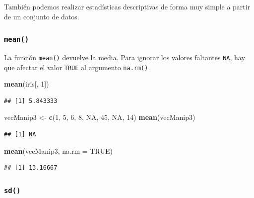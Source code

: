 \documentclass[
]{book}
\newenvironment{Shaded}{\begin{snugshade}}{\end{snugshade}}
\newcommand{\DataTypeTok}[1]{\textcolor[rgb]{0.13,0.29,0.53}{#1}}
\newcommand{\DecValTok}[1]{\textcolor[rgb]{0.00,0.00,0.81}{#1}}
\newcommand{\KeywordTok}[1]{\textcolor[rgb]{0.13,0.29,0.53}{\textbf{#1}}}
\newcommand{\NormalTok}[1]{#1}
\newcommand{\OtherTok}[1]{\textcolor[rgb]{0.56,0.35,0.01}{#1}}
\newcommand{\StringTok}[1]{\textcolor[rgb]{0.31,0.60,0.02}{#1}}
\begin{document}
También podemos realizar estadísticas descriptivas de forma muy simple a partir de un conjunto de datos.

\hypertarget{l015mean}{%
\subsubsection{\texorpdfstring{\texttt{mean()}}{mean()}}\label{l015mean}}

La función \texttt{mean()} devuelve la media. Para ignorar los valores faltantes \texttt{NA}, hay que afectar el valor \texttt{TRUE} al argumento \texttt{na.rm()}.

\begin{Shaded}
\begin{Highlighting}[]
\KeywordTok{mean}\NormalTok{(iris[, }\DecValTok{1}\NormalTok{])}
\end{Highlighting}
\end{Shaded}

\begin{verbatim}
## [1] 5.843333
\end{verbatim}

\begin{Shaded}
\begin{Highlighting}[]
\NormalTok{vecManip3 <-}\StringTok{ }\KeywordTok{c}\NormalTok{(}\DecValTok{1}\NormalTok{, }\DecValTok{5}\NormalTok{, }\DecValTok{6}\NormalTok{, }\DecValTok{8}\NormalTok{, }\OtherTok{NA}\NormalTok{, }\DecValTok{45}\NormalTok{, }\OtherTok{NA}\NormalTok{, }\DecValTok{14}\NormalTok{)}
\KeywordTok{mean}\NormalTok{(vecManip3)}
\end{Highlighting}
\end{Shaded}

\begin{verbatim}
## [1] NA
\end{verbatim}

\begin{Shaded}
\begin{Highlighting}[]
\KeywordTok{mean}\NormalTok{(vecManip3, }\DataTypeTok{na.rm =} \OtherTok{TRUE}\NormalTok{)}
\end{Highlighting}
\end{Shaded}

\begin{verbatim}
## [1] 13.16667
\end{verbatim}

\hypertarget{l015sd}{%
\subsubsection{\texorpdfstring{\texttt{sd()}}{sd()}}\label{l015sd}}
\end{document}
